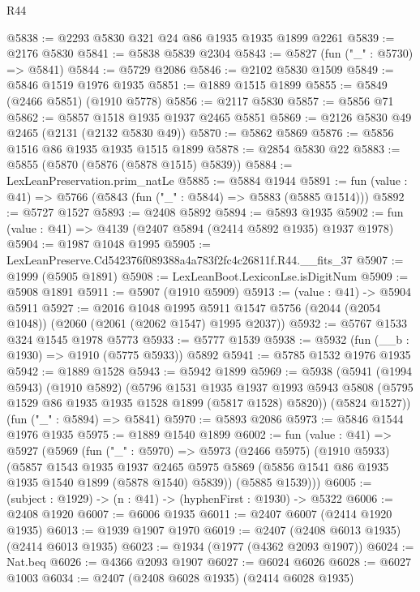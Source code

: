 \begin{lexlean}{R44}
\begin{coremodule}
@5838 := @2293 @5830 @321 @24 @86 @1935 @1935 @1899 @2261
@5839 := @2176 @5830
@5841 := @5838 @5839 @2304
@5843 := @5827 (fun ("_" : @5730) => @5841)
@5844 := @5729 @2086
@5846 := @2102 @5830 @1509
@5849 := @5846 @1519 @1976 @1935
@5851 := @1889 @1515 @1899
@5855 := @5849 (@2466 @5851) (@1910 @5778)
@5856 := @2117 @5830
@5857 := @5856 @71
@5862 := @5857 @1518 @1935 @1937 @2465 @5851
@5869 := @2126 @5830 @49 @2465 (@2131 (@2132 @5830 @49))
@5870 := @5862 @5869
@5876 := @5856 @1516 @86 @1935 @1935 @1515 @1899
@5878 := @2854 @5830 @22
@5883 := @5855 (@5870 (@5876 (@5878 @1515) @5839))
@5884 := LexLeanPreservation.prim_natLe
@5885 := @5884 @1944
@5891 := fun (value : @41) => @5766 (@5843 (fun ("_" : @5844) => @5883 (@5885 @1514)))
@5892 := @5727 @1527
@5893 := @2408 @5892
@5894 := @5893 @1935
@5902 := fun (value : @41) => @4139 (@2407 @5894 (@2414 @5892 @1935) @1937 @1978)
@5904 := @1987 @1048 @1995
@5905 := LexLeanPreserve.Cd542376f089388a4a783f2fc4c26811f.R44.__fits_37
@5907 := @1999 (@5905 @1891)
@5908 := LexLeanBoot.LexiconLse.isDigitNum
@5909 := @5908 @1891
@5911 := @5907 (@1910 @5909)
@5913 := (value : @41) -> @5904 @5911
@5927 := @2016
    @1048
    @1995
    @5911
    @1547
    @5756
    (@2044 (@2054 @1048))
    (@2060 (@2061 (@2062 @1547) @1995 @2037))
@5932 := @5767 @1533 @324 @1545 @1978 @5773
@5933 := @5777 @1539
@5938 := @5932 (fun (__b : @1930) => @1910 (@5775 @5933)) @5892
@5941 := @5785 @1532 @1976 @1935
@5942 := @1889 @1528
@5943 := @5942 @1899
@5969 := @5938
    (@5941
      (@1994 @5943)
      (@1910 @5892)
      (@5796
        @1531
        @1935
        @1937
        @1993
        @5943
        @5808
        (@5795 @1529 @86 @1935 @1935 @1528 @1899 (@5817 @1528) @5820))
      (@5824 @1527))
    (fun ("_" : @5894) => @5841)
@5970 := @5893 @2086
@5973 := @5846 @1544 @1976 @1935
@5975 := @1889 @1540 @1899
@6002 := fun (value : @41) =>
  @5927
    (@5969
      (fun ("_" : @5970) =>
      @5973
        (@2466 @5975)
        (@1910 @5933)
        (@5857
          @1543
          @1935
          @1937
          @2465
          @5975
          @5869
          (@5856 @1541 @86 @1935 @1935 @1540 @1899 (@5878 @1540) @5839))
        (@5885 @1539)))
@6005 := (subject : @1929) -> (n : @41) -> (hyphenFirst : @1930) -> @5322
@6006 := @2408 @1920
@6007 := @6006 @1935
@6011 := @2407 @6007 (@2414 @1920 @1935)
@6013 := @1939 @1907 @1970
@6019 := @2407 (@2408 @6013 @1935) (@2414 @6013 @1935)
@6023 := @1934 (@1977 (@4362 @2093 @1907))
@6024 := Nat.beq
@6026 := @4366 @2093 @1907
@6027 := @6024 @6026
@6028 := @6027 @1003
@6034 := @2407 (@2408 @6028 @1935) (@2414 @6028 @1935)

\end{coremodule}
\end{lexlean}
